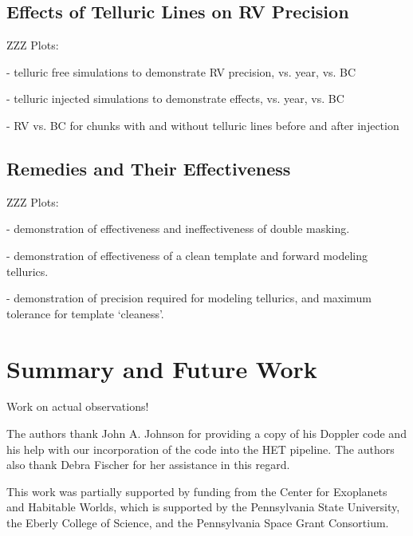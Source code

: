\documentclass{emulateapj}
\begin{document}
\begin{CJK*}{UTF8}{gbsn}
\subsection{Effects of Telluric Lines on RV Precision}

ZZZ Plots:

- telluric free simulations to demonstrate RV precision, vs. year,
vs. BC

- telluric injected simulations to demonstrate effects, vs. year, vs. BC

- RV vs. BC for chunks with and without telluric lines before and
after injection

\subsection{Remedies and Their Effectiveness}

ZZZ Plots:

- demonstration of effectiveness and ineffectiveness of double masking.

- demonstration of effectiveness of a clean template and forward
modeling tellurics.

- demonstration of precision required for modeling tellurics, and
maximum tolerance for template `cleaness'. 


\section{Summary and Future Work}\label{sec:summary}

Work on actual observations!


\acknowledgements
The authors thank John A. Johnson for providing a copy of his Doppler
code and his help with our incorporation of the code into the HET
pipeline.  The authors also thank Debra Fischer for her assistance in
this regard.

This work was partially supported by funding from the Center for
Exoplanets and Habitable Worlds, which is supported by the
Pennsylvania State University, the Eberly College of Science, and the
Pennsylvania Space Grant Consortium.


\end{CJK*}
\end{document}

